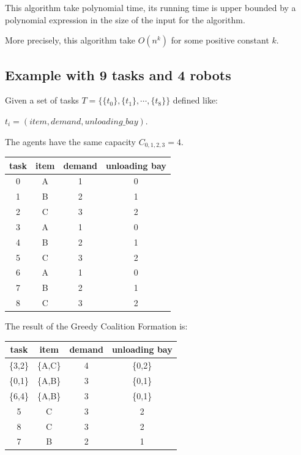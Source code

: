This algorithm take polynomial time, its running time is upper bounded by a polynomial expression
in the size of the input for the algorithm.

More precisely, this algorithm take $O(n^k)$ for some positive constant $k$. 

\newpage


\newpage
\subsection*{Example with 9 tasks and 4 robots}
Given a set of tasks $T = \{  \{t_0\}, \{t_1\}, \cdots, \{t_8\} \}$ defined like:

${t_i=(item, demand, unloading\_bay)}$.

The agents have the same capacity $C_{0,1,2,3} = 4$.

\begin{center}
  \begin{tabular}{|c|c|c|c|} \hline
  \textbf{task} & \textbf{item} & \textbf{demand} & \textbf{unloading bay} \\ \hline
  0    & A    & 1      & 0             \\
  1    & B    & 2      & 1             \\
  2    & C    & 3      & 2             \\
  3    & A    & 1      & 0             \\
  4    & B    & 2      & 1             \\
  5    & C    & 3      & 2             \\
  6    & A    & 1      & 0             \\
  7    & B    & 2      & 1             \\
  8    & C    & 3      & 2             \\ \hline       
  \end{tabular}
\end{center}


The result of the Greedy Coalition Formation is:
\begin{center}
  \begin{tabular}{|c|c|c|c|} \hline
  \textbf{task} & \textbf{item} & \textbf{demand} & \textbf{unloading bay} \\ \hline
  \{3,2\}    & \{A,C\}    & 4     & \{0,2\}             \\
  \{0,1\}    & \{A,B\}    & 3     & \{0,1\}             \\
  \{6,4\}    & \{A,B\}    & 3     & \{0,1\}             \\
  5    & C    & 3      & 2             \\
  8    & C    & 3      & 2             \\        
  7    & B    & 2      & 1             \\\hline
  \end{tabular}
\end{center}

